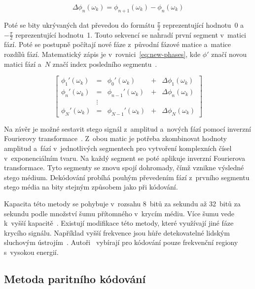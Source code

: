 \begin{equation}
    \label{eq:phase-diff}
    \Delta\phi_n(\omega_k) = \phi_{n+1}(\omega_k) - \phi_n(\omega_k)
\end{equation}

\noindent Poté se bity ukrývaných dat převedou do formátu $\frac{\pi}{2}$
reprezentující hodnotu~0 a~$-\frac{\pi}{2}$ reprezentující hodnotu~1. Touto
sekvencí se nahradí první segment v~matici fází. Poté se postupně počítají nové
fáze z~původní fázové matice a~matice rozdílů fází. Matematický zápis je
v~rovnici~\ref{eq:new-phases}, kde $\phi'$ značí novou matici fází a~$N$
značí index posledního segmentu~\cite{Bender1996}.

\begin{equation}
    \label{eq:new-phases}
    \left[
        \begin{array}{lclcl}
            \phi_1'(\omega_k) & = & \phi_0'(\omega_k)     & + & \Delta\phi_1(\omega_k) \\
            \phi_n'(\omega_k) & = & \phi_{n-1}'(\omega_k) & + & \Delta\phi_n(\omega_k) \\
                              & \vdots \\
            \phi_N'(\omega_k) & = & \phi_{N-1}'(\omega_k) & + & \Delta\phi_N(\omega_k)
        \end{array}
    \right]
\end{equation}

\noindent Na závěr je možné sestavit stego signál z~amplitud a~nových fází
pomocí inverzní Fourierovy transformace~\cite{Bender1996}. Z~obou matic je
potřeba zkombinovat hodnoty amplitud a~fází v~jednotlivých segmentech pro
vytvoření komplexních čísel v~exponenciálním tvaru. Na každý segment se poté
aplikuje inverzní Fourierova transformace. Tyto segmenty se znovu spojí
dohromady, čímž vznikne výsledné stego médium. Dekódování probíhá pouhým
převedením fází z~prvního segmentu stego média na bity stejným způsobem jako
při kódování.

Kapacita této metody se pohybuje v~rozsahu 8~bitů za sekundu až 32~bitů za
sekundu podle množství šumu přítomného v~krycím médiu. Více šumu vede k~vyšší
kapacitě~\cite{Bender1996}. Existují modifikace této metody, které využívají
jiné fáze krycího signálu. Například vyšší frekvence jsou hůře detekovatelné
lidským sluchovým ústrojím~\cite{Djebbar2014}. Autoři~\cite{Djebbar2014}
vybírají pro kódování pouze frekvenční regiony s~vysokou energií.

\subsection*{Metoda paritního kódování}
\label{sub:parity-coding}

